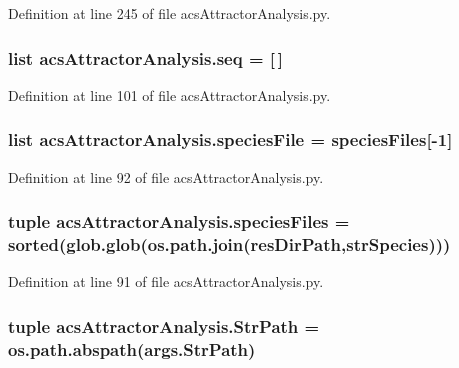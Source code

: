 Definition at line 245 of file acs\+Attractor\+Analysis.\+py.

\hypertarget{a00124_a33bc0e3fc99bab3df33d3f1626a19528}{
\subsubsection[{seq}]{\setlength{\rightskip}{0pt plus 5cm}list acs\+Attractor\+Analysis.\+seq = \mbox{[}$\,$\mbox{]}}}\label{a00124_a33bc0e3fc99bab3df33d3f1626a19528}


Definition at line 101 of file acs\+Attractor\+Analysis.\+py.

\hypertarget{a00124_a0e036b776f4f724254115c2e284657eb}{
\subsubsection[{species\+File}]{\setlength{\rightskip}{0pt plus 5cm}list acs\+Attractor\+Analysis.\+species\+File = {\bf species\+Files}\mbox{[}-\/1\mbox{]}}}\label{a00124_a0e036b776f4f724254115c2e284657eb}


Definition at line 92 of file acs\+Attractor\+Analysis.\+py.

\hypertarget{a00124_a670249d163388a9d93c8f3b9fb63afac}{
\subsubsection[{species\+Files}]{\setlength{\rightskip}{0pt plus 5cm}tuple acs\+Attractor\+Analysis.\+species\+Files = sorted(glob.\+glob(os.\+path.\+join({\bf res\+Dir\+Path},{\bf str\+Species})))}}\label{a00124_a670249d163388a9d93c8f3b9fb63afac}


Definition at line 91 of file acs\+Attractor\+Analysis.\+py.

\hypertarget{a00124_a8941499f40259763765b64e3185be82c}{
\subsubsection[{Str\+Path}]{\setlength{\rightskip}{0pt plus 5cm}tuple acs\+Attractor\+Analysis.\+Str\+Path = os.\+path.\+abspath(args.\+Str\+Path)}}\label{a00124_a8941499f40259763765b64e3185be82c}


